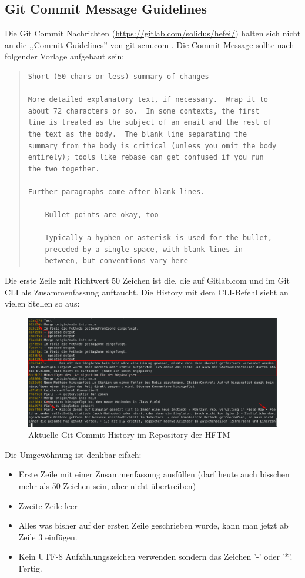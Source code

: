 \subsection{Git Commit Message Guidelines}
Die Git Commit Nachrichten (\url{https://gitlab.com/solidus/hefei/}) halten sich nicht an die ,,Commit Guidelines'' von \href{https://git-scm.com/book/en/v2/Distributed-Git-Contributing-to-a-Project}{git-scm.com} \cite{git-scm.com-guide}. Die Commit Message sollte nach folgender Vorlage aufgebaut sein:
\begin{quote}
\begin{lstlisting}[language=none,caption={Template einer Git commit message}]
Short (50 chars or less) summary of changes

More detailed explanatory text, if necessary.  Wrap it to
about 72 characters or so.  In some contexts, the first
line is treated as the subject of an email and the rest of
the text as the body.  The blank line separating the
summary from the body is critical (unless you omit the body
entirely); tools like rebase can get confused if you run
the two together.

Further paragraphs come after blank lines.

  - Bullet points are okay, too

  - Typically a hyphen or asterisk is used for the bullet,
    preceded by a single space, with blank lines in
    between, but conventions vary here

\end{lstlisting}
\end{quote}
Die erste Zeile mit Richtwert 50 Zeichen ist die, die auf Gitlab.com und im Git CLI als Zusammenfassung auftaucht. Die History mit dem CLI-Befehl  sieht an vielen Stellen so aus:
\begin{figure}[H]
	\centering
	\includegraphics[width=1.0\textwidth]{img/git-commit-message.png}
	\caption{Aktuelle Git Commit History im Repository der HFTM}
	\label{fig:git-commit-message}
\end{figure}
Die Umgewöhnung ist denkbar eifach:
\begin{itemize}
	\item Erste Zeile mit einer Zusammenfassung ausfüllen (darf heute auch bisschen mehr als 50 Zeichen sein, aber nicht übertreiben)
	\item Zweite Zeile leer
	\item Alles was bisher auf der ersten Zeile geschrieben wurde, kann man jetzt ab Zeile 3 einfügen.
	\item Kein UTF-8 Aufzählungszeichen verwenden sondern das Zeichen '-' oder '*'. Fertig.
\end{itemize}

